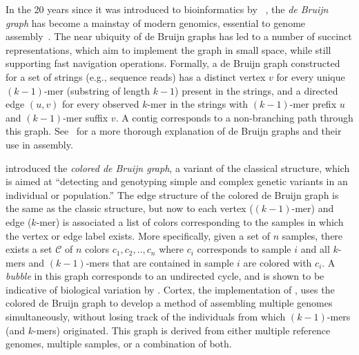

In the 20 years since it was introduced to bioinformatics by ~\cite{IW95}, the {\em de Bruijn graph} has become a mainstay of modern genomics, essential to genome assembly~\citep{how,sequel,ismb2015}. The near ubiquity of de Bruijn graphs has led to a number of succinct representations, which aim to implement the graph in small space, while still supporting fast navigation operations.  Formally, a de Bruijn graph constructed for a set of strings (e.g., sequence reads) has a distinct vertex $v$ for every unique $(k - 1)$-mer (substring of length $k - 1$) present in the strings, and a directed edge $(u, v)$ for every observed $k$-mer in the strings with $(k - 1)$-mer prefix $u$ and $(k - 1)$-mer suffix $v$. A contig corresponds to a non-branching path through this graph. See~\citep{how} for a more thorough explanation of de Bruijn graphs and their use in assembly. 

\cite{ICTFM12} introduced the {\em colored de Bruijn graph}, a variant of the classical structure, which is aimed at ``detecting and genotyping simple and complex genetic variants in an individual or population.'' The edge structure of the colored de Bruijn graph is the same as the classic structure, but now to each vertex ($(k - 1)$-mer) and edge ($k$-mer)
is associated a list of colors corresponding to the samples in which the vertex or edge label exists. More specifically, given a set of $n$ samples, there exists a set $\mathcal{C}$ of $n$ colors $c_1, c_2, .., c_n$ where $c_i$ corresponds to sample $i$ and all $k$-mers and $(k-1)$-mers that are contained in sample $i$ are colored with $c_i$. A {\em bubble} in this graph corresponds to an undirected cycle, and is shown to be indicative of biological variation by \cite{ICTFM12}. 
{\sc Cortex}, the implementation of \cite{ICTFM12}, uses the colored de Bruijn graph to develop a method of assembling multiple genomes simultaneously, without losing track of the individuals from which $(k - 1)$-mers (and $k$-mers) originated. This graph is derived from either multiple reference genomes, multiple samples, or a combination of both.

